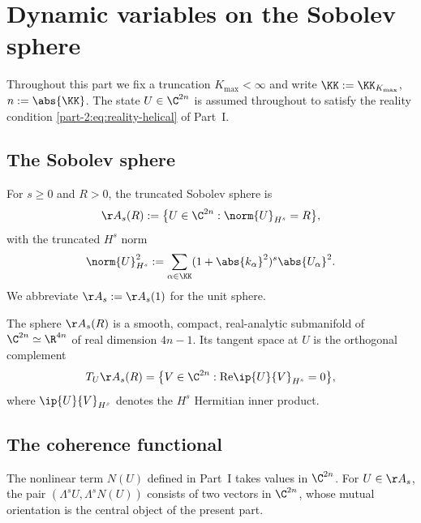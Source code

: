 \section{Dynamic variables on the Sobolev sphere}
\label{part-2:sec:variables}

Throughout this part we fix a truncation $K_{\max}<\infty$ and write 
$\KK := \KK_{K_{\max}}$, $n := \abs{\KK}$. The state 
$U\in\C^{2n}$ is assumed throughout to satisfy the reality condition 
\eqref{part-2:eq:reality-helical} of Part~I.

\subsection{The Sobolev sphere}
\label{part-2:ssec:sphere}

\begin{definition}\label{part-2:def:sphere}
For $s\geq 0$ and $R>0$, the truncated Sobolev sphere is
\begin{equation}\label{part-2:eq:sphere}
\AA_s(R) := \bigl\{ U\in\C^{2n} : \norm{U}_{H^s} = R \bigr\},
\end{equation}
with the truncated $H^s$ norm
\begin{equation}\label{part-2:eq:Hs-norm}
\norm{U}_{H^s}^2 := \sum_{\alpha\in\KK} (1+\abs{k_\alpha}^2)^s \abs{U_\alpha}^2.
\end{equation}
We abbreviate $\AA_s := \AA_s(1)$ for the unit sphere.
\end{definition}

The sphere $\AA_s(R)$ is a smooth, compact, real-analytic submanifold 
of $\C^{2n}\simeq\R^{4n}$ of real dimension $4n-1$. Its tangent space 
at $U$ is the orthogonal complement
\begin{equation}\label{part-2:eq:tangent}
T_U\AA_s(R) = \bigl\{ V\in\C^{2n} : \mathrm{Re}\ip{U}{V}_{H^s} = 0 \bigr\},
\end{equation}
where $\ip{U}{V}_{H^s}$ denotes the $H^s$ Hermitian inner product.

\subsection{The coherence functional}
\label{part-2:ssec:chi}

The nonlinear term $N(U)$ defined in Part~I takes values in $\C^{2n}$. 
For $U\in\AA_s$, the pair $(\Lambda^s U, \Lambda^s N(U))$ consists of two 
vectors in $\C^{2n}$, whose mutual orientation is the central object of 
the present part.


